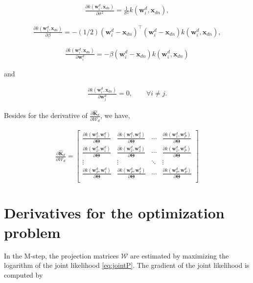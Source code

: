 \documentclass[]{article}
\newcommand{\dWj}{\partial\projMat}
\newcommand{\kernelww}[2]{k\left(\mathbf{w}_{#1}^d,\mathbf{w}_{#2}^d\right)}
\newcommand{\kernelwx}[1]{k\left(\mathbf{w}_{#1}^d,\indobj\right)}
\newcommand{\W}{\boldsymbol{\mathcal{W}}}
\newcommand{\indobj}{\mathbf{x}_{dn}}
\newcommand{\projMat}{\boldsymbol{\mathcal{W}}_d}
\newcommand{\wIj}[1]{\mathbf{w}_{#1}^d}
\newcommand{\dWd}{\partial \boldsymbol{\Theta}}
\begin{document}
\begin{align}
 \frac{\partial \kernelwx{i}}{\partial \sigma^2} = \frac{1}{\sigma^2}\kernelwx{i},
\end{align}

\begin{align}
\frac{\partial \kernelwx{1}}{\partial \beta} = -(1/2)\left(\mathbf{w}_i^d-\mathbf{x}_{dn}\right)^\top\left(\mathbf{w}_i^d-\mathbf{x}_{dn}\right)\kernelwx{i},
\end{align}

\begin{align}
\frac{\partial \kernelwx{i}}{\partial \wIj{i}} = -\beta\left(\mathbf{w}_i^d-\mathbf{x}_{dn}\right)\kernelwx{i}
\end{align}

and

\begin{align}
\frac{\partial \kernelwx{i}}{\partial \mathbf{w}_j^d} =0,   \quad \quad \forall i\ne j.
\end{align}


Besides for the derivative of $\frac{\partial \mathbf{\hat{K}}_d}{\dWj}$, we have,

\begin{align}
\frac{\partial \mathbf{\hat{K}}_d}{\dWj} =  \left[ \begin{matrix}
   \frac{\partial \kernelww{1}{1}}{\dWd} & \frac{\partial \kernelww{1}{2}}{\dWd} & \cdots & \frac{\partial \kernelww{1}{P}}{\dWd}\\
   \frac{\partial \kernelww{2}{1}}{\dWd} & \frac{\partial \kernelww{2}{2}}{\dWd} & \cdots & \frac{\partial \kernelww{2}{P}}{\dWd}\\
   \vdots  & \vdots  & \ddots & \vdots  \\
   \frac{\partial \kernelww{P}{1}}{\dWd} & \frac{\partial \kernelww{P}{2}}{\dWd} & \cdots & \frac{\partial \kernelww{P}{P}}{\dWd}\\
   \end{matrix}\right] 
\end{align}


\section{Derivatives for the optimization problem}

In the M-step, the projection matrices $\W$ are estimated by maximizing the logarithm of the joint likelihood \eqref{eq:jointP}. The gradient of the joint likelihood is computed by
\end{document}
